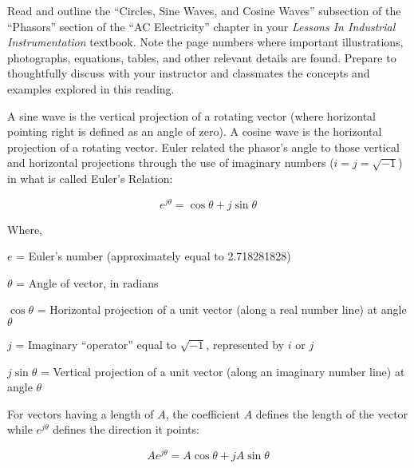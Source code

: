 

Read and outline the ``Circles, Sine Waves, and Cosine Waves'' subsection of the ``Phasors'' section of the ``AC Electricity'' chapter in your {\it Lessons In Industrial Instrumentation} textbook.  Note the page numbers where important illustrations, photographs, equations, tables, and other relevant details are found.  Prepare to thoughtfully discuss with your instructor and classmates the concepts and examples explored in this reading.













A sine wave is the vertical projection of a rotating vector (where horizontal pointing right is defined as an angle of zero).  A cosine wave is the horizontal projection of a rotating vector.  Euler related the phasor's angle to those vertical and horizontal projections through the use of imaginary numbers ($i = j = \sqrt{-1}$) in what is called Euler's Relation:

$$e^{j \theta} = \cos \theta + j \sin \theta$$

\noindent
Where,

$e$ = Euler's number (approximately equal to 2.718281828)

$\theta$ = Angle of vector, in radians

$\cos \theta$ = Horizontal projection of a unit vector (along a real number line) at angle $\theta$

$j$ = Imaginary ``operator'' equal to $\sqrt{-1}$, represented by $i$ or $j$

$j \sin \theta$ = Vertical projection of a unit vector (along an imaginary number line) at angle $\theta$

\vskip 10pt

For vectors having a length of $A$, the coefficient $A$ defines the length of the vector while $e^{j \theta}$ defines the direction it points:

$$Ae^{j \theta} = A \cos \theta + j A \sin \theta$$

\vskip 10pt

